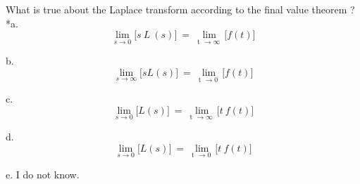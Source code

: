 
What is true about the Laplace transform according to the final value
theorem ? \\

*a.
$$\lim_{s \rightarrow 0}\lbrack s\ L\ (s)\rbrack\  = \ \lim_{\text{t\ } \rightarrow \infty\ }\lbrack f(t)\rbrack$$

b.
$$\lim_{s \rightarrow \infty}\lbrack sL(s)\rbrack\ = \ \lim_{\text{t\ } \rightarrow 0\ }\lbrack f(t)\rbrack$$

c.
$$\lim_{s \rightarrow 0}\lbrack L(s)\rbrack\  = \ \lim_{\text{t\ } \rightarrow \infty\ }\lbrack t\ f(t)\rbrack$$

d.
$$\lim_{s \rightarrow 0}\lbrack L(s)\rbrack\  = \ \lim_{\text{t\ } \rightarrow 0\ }\lbrack t\ f(t)\rbrack$$

e. I do not know. \\

